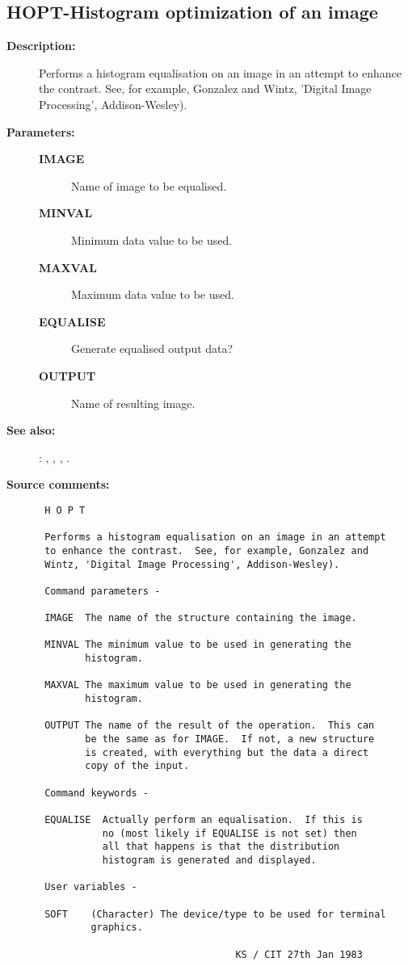 \subsection{HOPT-\label{HOPT}Histogram optimization of an image}
\begin{description}

\item [{\bf Description:}]
 Performs a histogram equalisation on an image in an attempt
 to enhance the contrast.  See, for example, Gonzalez and
 Wintz, 'Digital Image Processing', Addison-Wesley).

\item [{\bf Parameters:}]
\begin{description}
\item [{\bf IMAGE}]
 Name of image to be equalised.
\item [{\bf MINVAL}]
 Minimum data value to be used.
\item [{\bf MAXVAL}]
 Maximum data value to be used.
\item [{\bf EQUALISE}]
 Generate equalised output data?
\item [{\bf OUTPUT}]
 Name of resulting image.
\end{description}

\item [{\bf See also:}]
: , , , .\\

\item [{\bf Source comments:}]
\begin{verbatim}
 H O P T

 Performs a histogram equalisation on an image in an attempt
 to enhance the contrast.  See, for example, Gonzalez and
 Wintz, 'Digital Image Processing', Addison-Wesley).

 Command parameters -

 IMAGE  The name of the structure containing the image.

 MINVAL The minimum value to be used in generating the
        histogram.

 MAXVAL The maximum value to be used in generating the
        histogram.

 OUTPUT The name of the result of the operation.  This can
        be the same as for IMAGE.  If not, a new structure
        is created, with everything but the data a direct
        copy of the input.

 Command keywords -

 EQUALISE  Actually perform an equalisation.  If this is
           no (most likely if EQUALISE is not set) then
           all that happens is that the distribution
           histogram is generated and displayed.

 User variables -

 SOFT    (Character) The device/type to be used for terminal
         graphics.

                                  KS / CIT 27th Jan 1983
\end{verbatim}
\end{description}

